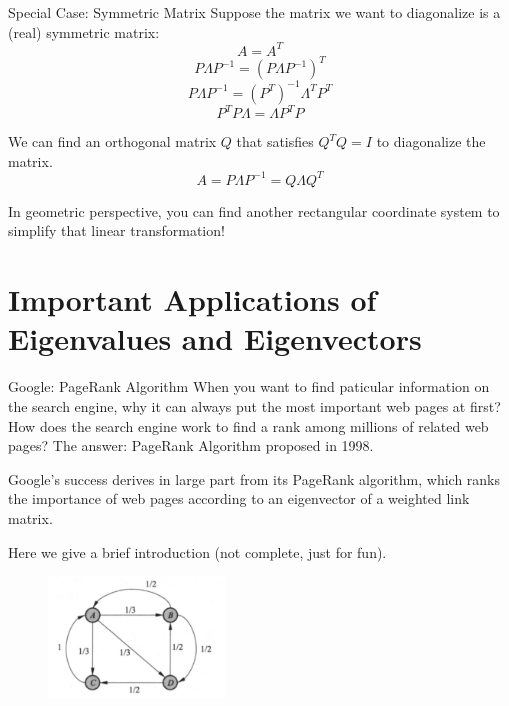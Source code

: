 \documentclass{beamer}
\begin{document}
\begin{frame}{Special Case: Symmetric Matrix}
Suppose the matrix we want to diagonalize is a (real) symmetric matrix:
\begin{equation*}
    A=A^T
\end{equation*}
\begin{equation*}
    P\varLambda P^{-1}=\left( P\varLambda P^{-1} \right) ^T
\end{equation*}
\begin{equation*}
    P\varLambda P^{-1}=\left( P^T \right) ^{-1}\varLambda ^TP^T
\end{equation*}
\begin{equation*}
    P^TP\varLambda =\varLambda P^TP
\end{equation*}

We can find an orthogonal matrix $Q$ that satisfies $Q^TQ=I$ to diagonalize the matrix.
\begin{equation*}
    A=P\varLambda P^{-1}=Q\varLambda Q^{T}
\end{equation*}

In geometric perspective, you can find another rectangular coordinate system to simplify that linear transformation!
\end{frame}

\section{Important Applications of Eigenvalues and Eigenvectors}
\begin{frame}{Google: PageRank Algorithm}
When you want to find paticular information on the search engine, why it can always put the most important web pages at first? How does the search engine work to find a rank among millions of related web pages? The answer: PageRank Algorithm proposed in 1998.

\vspace{3pt}
Google’s success derives in large part from its PageRank algorithm, which ranks the importance of web pages according to an eigenvector of a weighted link matrix.

\vspace{3pt}
Here we give a brief introduction (not complete, just for fun).

\begin{figure}
    \centering
    \includegraphics[width=0.42\textwidth]{pr.png}
\end{figure}
\end{frame}
\end{document}
